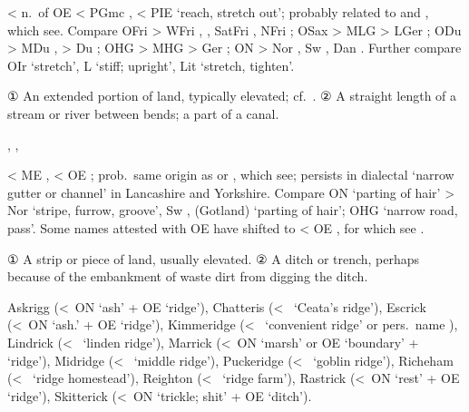 \documentclass[12pt,letterpaper,oneside,article,draft]{memoir}
\begin{document}
\begin{Lemma}
\begin{Etymology}
	< n.\ of OE  < PGmc ,  < PIE  ‘reach, stretch out’;
		probably related to  and , which see.
	Compare
	OFri  > WFri , , SatFri , NFri ;
	OSax  > MLG  > LGer ;
	ODu  > MDu ,  > Du ;
	OHG  > MHG  > Ger ;
	ON  > Nor , Sw , Dan .
	Further compare
	OIr  ‘stretch’, L  ‘stiff; upright’, Lit  ‘stretch, tighten’.	
\end{Etymology}
\begin{Definitions}
	① An extended portion of land, typically elevated; cf.\ .
	② A straight length of a stream or river between bends; a part of a canal.
\end{Definitions}
\end{Lemma}

\begin{Lemma}
\begin{Also}
	, , 
\end{Also}
\begin{Etymology}
	< ME ,  < OE ; prob.\ same origin as  or , which see;
		persists in dialectal  ‘narrow gutter or channel’ in Lancashire and Yorkshire.
	Compare
	ON  ‘parting of hair’ > Nor  ‘stripe, furrow, groove’,
		Sw , (Gotland)  ‘parting of hair’;
	OHG  ‘narrow road, pass’. Some names attested with OE  have shifted to
		 < OE , for which see .
\end{Etymology}
\begin{Definitions}
	① A strip or piece of land, usually elevated.
	② A ditch or trench, perhaps because of the embankment of waste dirt from digging the ditch.
\end{Definitions}
\begin{Examples}
	Askrigg (<~ON  ‘ash’ + OE  ‘ridge’),
	Chatteris (<~ ‘Ceata’s ridge’),
	Escrick (<~ON  ‘ash.’ + OE  ‘ridge’),
	Kimmeridge (<~ ‘convenient ridge’ or pers.\ name ),
	Lindrick (<~ ‘linden ridge’),
	Marrick (<~ON  ‘marsh’ or OE  ‘boundary’ +  ‘ridge’),
	Midridge (<~ ‘middle ridge’),
	Puckeridge (<~ ‘goblin ridge’),
	Richeham (<~ ‘ridge homestead’),
	Reighton (<~ ‘ridge farm’),
	Rastrick (<~ON  ‘rest’ + OE  ‘ridge’),
	Skitterick (<~ON  ‘trickle; shit’ + OE  ‘ditch’).
\end{Examples}
\end{Lemma}
\end{document}
